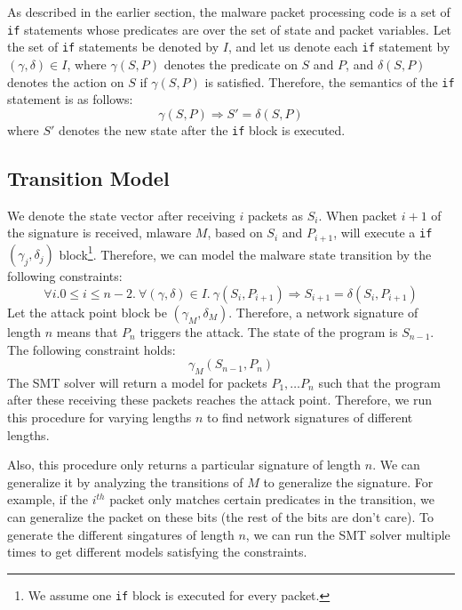 \documentclass[]{article}
\begin{document}
As described in the earlier section, the malware
packet processing code is a set of \texttt{if} 
statements whose predicates are over the set of state
and packet variables. Let the set of \texttt{if} 
statements be denoted by $I$, and let us denote each \texttt{if} 
statement by $(\gamma, \delta) \in I$, where $\gamma(S,P)$
denotes the predicate on $S$ and $P$, and $\delta(S,P)$ denotes
the action on $S$ if $\gamma(S,P)$ is satisfied. Therefore,
the semantics of the \texttt{if} statement is as follows:
\begin{equation}
\gamma(S,P) \Rightarrow S' = \delta(S,P)
\end{equation}
where $S'$ denotes the new state after the \texttt{if} 
block is executed.

\subsection{Transition Model}
We denote the state
vector after receiving $i$ packets as $S_i$.
When packet $i+1$ of the signature is received, 
mlaware $M$, based on $S_i$ and $P_{i+1}$, will execute 
a \texttt{if} $(\gamma_j, \delta_j)$ block\footnote{
	We assume one \texttt{if} block is executed for every packet.}.
Therefore, we can model the malware state transition 
by the following constraints: 
\begin{equation}
	\forall i. 0 \leq i \leq n-2.~\forall (\gamma, \delta) \in I. ~\gamma(S_i, P_{i+1}) \Rightarrow S_{i+1} = \delta(S_i, P_{i+1})
\end{equation}
Let the attack point block be $(\gamma_M, \delta_M)$. 
Therefore, a network signature of length $n$ means
that $P_n$ triggers the attack. The state of the program
is $S_{n-1}$. The following constraint holds:
\begin{equation}
	\gamma_M(S_{n-1},P_{n})
\end{equation}
The SMT solver will return a model for packets $P_1,
\ldots P_n$ such that the program after these receiving
these packets reaches the attack point. Therefore, 
we run this procedure for varying lengths $n$ to find
network signatures of different lengths.

Also, this procedure only returns a particular signature
of length $n$. We can generalize it by analyzing the 
transitions of $M$ to generalize the signature. For
example, if the $i^{th}$ packet only matches certain 
predicates in the transition, we can generalize the packet on
these bits (the rest of the bits are don't care). To 
generate the different singatures of length $n$, 
we can run the SMT solver multiple times to get different 
models satisfying the constraints.
\end{document}
